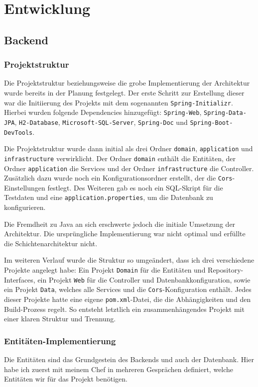 \chapter{Entwicklung}\label{ch:method}
\section{Backend}
\subsection{Projektstruktur}
Die Projektstruktur beziehungsweise die grobe Implementierung der Architektur wurde bereits in der Planung festgelegt. 
Der erste Schritt zur Erstellung dieser war die Initiierung des Projekts mit dem sogenannten \texttt{Spring-Initializr}. 
Hierbei wurden folgende Dependencies hinzugefügt: \texttt{Spring-Web}, \texttt{Spring-Data-JPA}, \texttt{H2-Database}, \texttt{Microsoft-SQL-Server}, \texttt{Spring-Doc} und \texttt{Spring-Boot-DevTools}.

Die Projektstruktur wurde dann initial als drei Ordner \texttt{domain}, \texttt{application} und \texttt{infrastructure} verwirklicht.
Der Ordner \texttt{domain} enthält die Entitäten, der Ordner \texttt{application} die Services und der Ordner \texttt{infrastructure} die Controller.
Zusätzlich dazu wurde noch ein Konfigurationsordner erstellt, der die \texttt{Cors}-Einstellungen festlegt. 
Des Weiteren gab es noch ein SQL-Skript für die Testdaten und eine \texttt{application.properties}, um die Datenbank zu konfigurieren.

Die Fremdheit zu Java an sich erschwerte jedoch die initiale Umsetzung der Architektur. Die ursprüngliche Implementierung war nicht optimal und erfüllte
die Schichtenarchitektur nicht.

Im weiteren Verlauf wurde die Struktur so umgeändert, dass ich drei verschiedene Projekte angelegt habe: 
Ein Projekt \texttt{Domain} für die Entitäten und Repository-Interfaces, ein Projekt \texttt{Web} für die Controller und Datenbankkonfiguration, sowie ein Projekt \texttt{Data}, 
welches alle Services und die \texttt{Cors}-Konfiguration enthält. Jedes dieser Projekte hatte eine eigene \texttt{pom.xml}-Datei, die 
die Abhängigkeiten und den Build-Prozess regelt. So entsteht letztlich ein zusammenhängendes Projekt mit einer klaren Struktur und Trennung.


\subsection{Entitäten-Implementierung}
Die Entitäten sind das Grundgestein des Backends und auch der Datenbank.
Hier habe ich zuerst mit meinem Chef in mehreren Gesprächen definiert, welche Entitäten wir für das Projekt benötigen.

